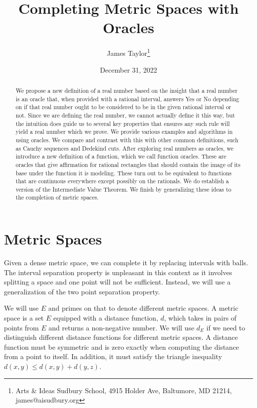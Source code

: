 \documentclass[12pt]{article}
\title{Completing Metric Spaces with Oracles}
\author{
  James Taylor\footnote{Arts \& Ideas Sudbury School, 4915 Holder Ave, Baltumore, MD 21214, james@aisudbury.org}
}
\date{December 31, 2022}
\theoremstyle{remark}
\begin{document}
\maketitle
\begin{abstract}
 We propose a new definition of a real number based on the insight that a real number is an oracle that, when provided with a rational interval, answers Yes or No depending on if that real number ought to be considered to be in the given rational interval or not. Since we are defining the real number, we cannot actually define it this way, but the intuition does guide us to several key properties that ensures any such rule will yield a real number which we prove. We provide various examples and algorithms in using oracles. We compare and contrast with this with other common definitions, such as Cauchy sequences and Dedekind cuts. After exploring real numbers as oracles, we introduce a new definition of a function, which we call function oracles. These are oracles that give affirmation for rational rectangles that should contain the image of its base under the function it is modeling. These turn out to be equivalent to functions that are continuous everywhere except possibly on the rationals. We do establish a version of the Intermediate Value Theorem. We finish by generalizing these ideas to the completion of metric spaces. 
\end{abstract}


\section{Metric Spaces}

Given a dense metric space, we can complete it by replacing intervals with balls. The interval separation property is unpleasant in this context as it involves splitting a space and one point will not be sufficient. Instead, we will use a generalization of the two point separation property. 

We will use $E$ and primes on that to denote different metric spaces. A metric space is a set $E$ equipped with a distance function, $d$, which takes in pairs of points from $E$ and returns a non-negative number. We will use $d_E$ if we need to distinguish different distance functions for different metric spaces. A distance function must be symmetric and is zero exactly when computing the distance from a point to itself. In addition, it must satisfy the triangle inequality $d(x,y) \leq d(x,y) + d(y,z)$. 
\end{document}
